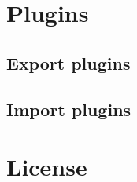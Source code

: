 \documentclass{manual}
\begin{document}




\chapter{Plugins \label{plugins}}

\section{Export plugins}





\section{Import plugins \label{importplugins}}













\appendix

%

\chapter{License}


%
%

\renewcommand{\indexname}{Module Index}

\renewcommand{\indexname}{Index}
\end{document}
